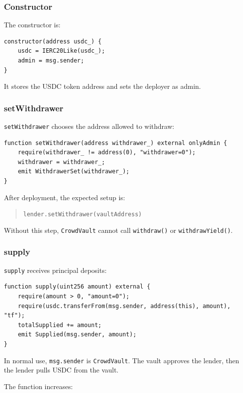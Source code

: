 \documentclass[11pt,a4paper]{article}
\begin{document}
\subsubsection{Constructor}

The constructor is:

\begin{lstlisting}
constructor(address usdc_) {
    usdc = IERC20Like(usdc_);
    admin = msg.sender;
}
\end{lstlisting}

It stores the USDC token address and sets the deployer as admin.

\subsubsection{setWithdrawer}

\texttt{setWithdrawer} chooses the address allowed to withdraw:

\begin{lstlisting}
function setWithdrawer(address withdrawer_) external onlyAdmin {
    require(withdrawer_ != address(0), "withdrawer=0");
    withdrawer = withdrawer_;
    emit WithdrawerSet(withdrawer_);
}
\end{lstlisting}

After deployment, the expected setup is:

\begin{quote}
\texttt{lender.setWithdrawer(vaultAddress)}
\end{quote}

Without this step, \texttt{CrowdVault} cannot call \texttt{withdraw()} or \texttt{withdrawYield()}.

\subsubsection{supply}

\texttt{supply} receives principal deposits:

\begin{lstlisting}
function supply(uint256 amount) external {
    require(amount > 0, "amount=0");
    require(usdc.transferFrom(msg.sender, address(this), amount), "tf");
    totalSupplied += amount;
    emit Supplied(msg.sender, amount);
}
\end{lstlisting}

In normal use, \texttt{msg.sender} is \texttt{CrowdVault}. The vault approves the lender, then the lender pulls USDC from the vault.

The function increases:
\end{document}
